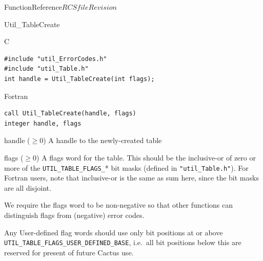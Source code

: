 \begin{cactuspart}{FunctionReference}{$RCSfile$}{$Revision$}
\begin{FunctionDescription}{Util\_TableCreate}
\begin{SynopsisSection}
\begin{Synopsis}{C}
\begin{verbatim}
#include "util_ErrorCodes.h"
#include "util_Table.h"
int handle = Util_TableCreate(int flags);
\end{verbatim}
\end{Synopsis}
\begin{Synopsis}{Fortran}
\begin{verbatim}
call Util_TableCreate(handle, flags)
integer handle, flags
\end{verbatim}
\end{Synopsis}
\end{SynopsisSection}

\begin{ResultSection}
\begin{Result}{handle ($\ge 0$)}
A handle to the newly-created table
\end{Result}
\end{ResultSection}

\begin{ParameterSection}
\begin{Parameter}{flags ($\ge 0$)}
A flags word for the table.  This should be the inclusive-or of zero
or more of the \verb|UTIL_TABLE_FLAGS_|* bit masks (defined in
\verb|"util_Table.h"|).  For Fortran users, note that inclusive-or
is the same as sum here, since the bit masks are all disjoint.
\end{Parameter}
\end{ParameterSection}

\begin{Discussion}
We require the flags word to be non-negative so that other
functions can distinguish flags from (negative) error codes.

Any User-defined flag words should use only bit positions at or above\\
\verb|UTIL_TABLE_FLAGS_USER_DEFINED_BASE|, i.e.\ all bit positions
below this are reserved for present of future Cactus use.


\end{Discussion}
\end{FunctionDescription}
\end{cactuspart}

